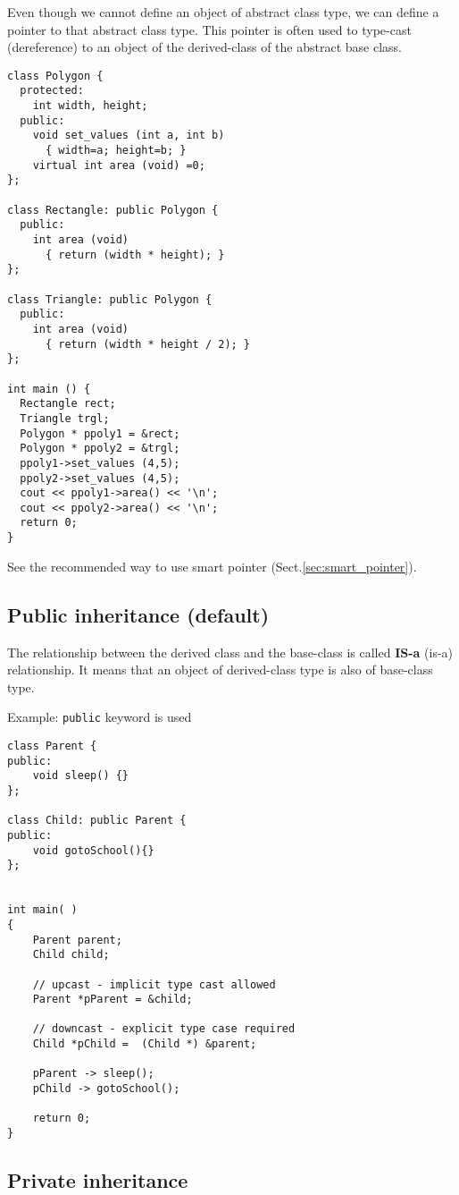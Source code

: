 Even though we cannot define an object of abstract class type, we can define a
pointer to that abstract class type. This pointer is often used to type-cast
(dereference) to an object of the derived-class of the abstract base class.

\begin{Verbatim}
class Polygon {
  protected:
    int width, height;
  public:
    void set_values (int a, int b)
      { width=a; height=b; }
    virtual int area (void) =0;
};

class Rectangle: public Polygon {
  public:
    int area (void)
      { return (width * height); }
};

class Triangle: public Polygon {
  public:
    int area (void)
      { return (width * height / 2); }
};

int main () {
  Rectangle rect;
  Triangle trgl;
  Polygon * ppoly1 = &rect;
  Polygon * ppoly2 = &trgl;
  ppoly1->set_values (4,5);
  ppoly2->set_values (4,5);
  cout << ppoly1->area() << '\n';
  cout << ppoly2->area() << '\n';
  return 0;
}	
\end{Verbatim}
See the recommended way to use smart pointer (Sect.\ref{sec:smart_pointer}).

\subsection{Public inheritance (default)}
\label{sec:inheritance_public}

The relationship between the derived class and the base-class is called {\bf
IS-a} (is-a) relationship. It means that an object of derived-class type is also
of base-class type. 

Example: \verb!public! keyword is used
\begin{Verbatim}
class Parent {
public:
	void sleep() {}
};

class Child: public Parent {
public:
	void gotoSchool(){}
};


int main( ) 
{ 
	Parent parent;
	Child child;

	// upcast - implicit type cast allowed
	Parent *pParent = &child; 

	// downcast - explicit type case required 
	Child *pChild =  (Child *) &parent;

	pParent -> sleep();
	pChild -> gotoSchool();
		
	return 0; 
}
\end{Verbatim}

\subsection{Private inheritance}
\label{sec:inheritance_private}

